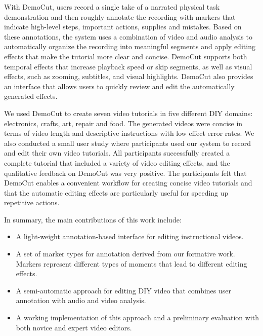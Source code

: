 With DemoCut, users record a single take of a narrated physical
task demonstration and then roughly annotate the recording with
markers that indicate high-level steps, important actions, supplies
and mistakes.
%
Based on these annotations, the system uses a combination of video and
audio analysis to automatically organize the recording into meaningful
segments and apply editing effects that make the tutorial more clear
and concise.
%
DemoCut supports both temporal effects that increase playback
speed or skip segments, as well as visual effects, such as
zooming, subtitles, and visual highlights.
%
DemoCut also provides an interface that allows users to quickly review
and edit the automatically generated effects.

We used DemoCut to create seven video tutorials in five
different DIY domains: electronics, crafts, art, repair and food.
The generated videos were concise in terms of video length and descriptive instructions with low effect error rates.
%
We also conducted a small user study where participants used
our system to record and edit their own video tutorials.
%
All participants successfully created a complete tutorial that
included a variety of video editing effects, and the qualitative
feedback on DemoCut was very positive.
%
The participants felt that DemoCut enables a convenient workflow for
creating concise video tutorials and that the automatic editing
effects are particularly useful for speeding up repetitive
actions.

In summary, the main contributions of this work include:

\begin{itemize}
  \setlength{\itemsep}{0pt}
\item A light-weight annotation-based interface for editing instructional videos.
\item A set of marker types for annotation derived from our formative work. Markers represent different types of moments that lead to different editing effects.
\item A semi-automatic approach for editing DIY video that
  combines user annotation with audio and video analysis.
\item A working implementation of this approach and a preliminary evaluation with both novice and expert video editors.
\end{itemize}
